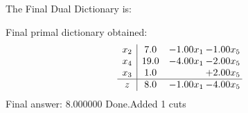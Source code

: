 \documentclass[8pt]{article}
\begin{document}
The Final Dual Dictionary is: 

 Final primal dictionary obtained: 
\[\begin{array}{c| c c@{\hskip 2pt} c@{\hskip 2pt} }
 x_{2}   &  7.0 & -1.00 x_{1} & -1.00 x_{5}\\
 x_{4}   &  19.0 & -4.00 x_{1} & -2.00 x_{5}\\
 x_{3}   &  1.0  &   & +  2.00 x_{5}\\
\hline
z    &  8.0 & -1.00 x_{1} & -4.00 x_{5}\\
\end{array}\]
 Final answer: 8.000000 
Done.Added 1 cuts 
\end{document}
